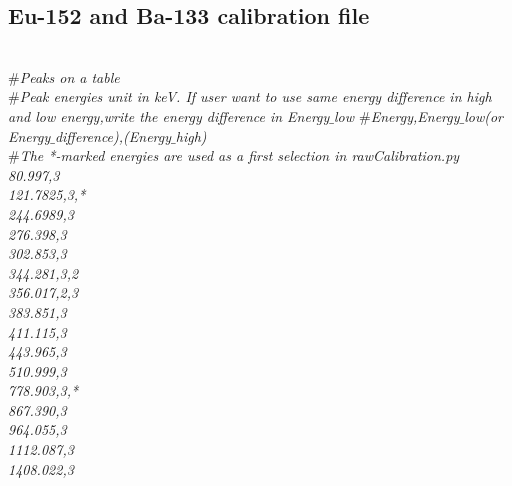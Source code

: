 \documentclass{article}
\begin{document}
\begin{appendices}

	\section{Eu-152 and Ba-133 calibration file}
	\label{sec:appendices1}
	\textit{\\
	$\#$Peaks on a table\\
	$\#$Peak energies unit in keV. If user want to use same energy difference in high and low energy,write the energy difference in Energy$\_$low
	$\#$Energy,Energy$\_$low(or Energy$\_$difference),(Energy$\_$high)\\
	$\#$The *-marked energies are used as a first selection in rawCalibration.py\\
	80.997,3\\
	121.7825,3,*\\
	244.6989,3\\
	276.398,3\\
	302.853,3\\
	344.281,3,2\\
	356.017,2,3\\
	383.851,3\\
	411.115,3\\
	443.965,3\\
	510.999,3\\
	778.903,3,*\\
	867.390,3\\
	964.055,3\\
	1112.087,3\\
	1408.022,3\\
}
\end{appendices}
\end{document}
